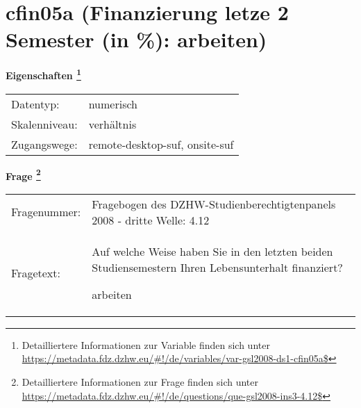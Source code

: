 
    \setcounter{footnote}{0}

    \vspace*{-1.8cm}
	\section{cfin05a (Finanzierung letze 2 Semester (in \%): arbeiten)}
	\label{section:cfin05a}



    \vspace*{0.5cm}
    \noindent\textbf{Eigenschaften
	\footnote{Detailliertere Informationen zur Variable finden sich unter
		\url{https://metadata.fdz.dzhw.eu/\#!/de/variables/var-gsl2008-ds1-cfin05a$}}}\\
	\begin{tabularx}{\hsize}{@{}lX}
	Datentyp: & numerisch \\
	Skalenniveau: & verhältnis \\
	Zugangswege: &
	  remote-desktop-suf, 
	  onsite-suf
 \\
    \end{tabularx}



				\vspace*{0.5cm}
                \noindent\textbf{Frage
	                \footnote{Detailliertere Informationen zur Frage finden sich unter
		              \url{https://metadata.fdz.dzhw.eu/\#!/de/questions/que-gsl2008-ins3-4.12$}}}\\
				\begin{tabularx}{\hsize}{@{}lX}
					Fragenummer: &
					  Fragebogen des DZHW-Studienberechtigtenpanels 2008 - dritte Welle:
					  4.12
 \\
					Fragetext: & Auf welche Weise haben Sie in den letzten beiden Studiensemestern Ihren Lebensunterhalt finanziert?\par  arbeiten \\
				\end{tabularx}





